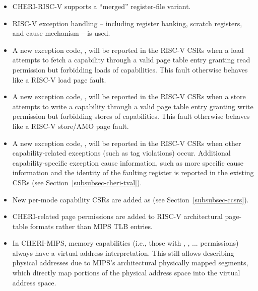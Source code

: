\begin{itemize}
\item CHERI-RISC-V supports a ``merged'' register-file variant.
\item RISC-V exception handling -- including register banking, scratch
  registers, and cause mechanism -- is used.
\item A new exception code, \riscvloadcappagefault{}, will be
  reported in the RISC-V \xcause{} CSRs when a load attempts to fetch a
  capability through a valid page table entry granting read permission but
  forbidding loads of capabilities.  This fault otherwise behaves like a RISC-V
  load page fault.
\item A new exception code, \riscvstorecappagefault{}, will be
  reported in the RISC-V \xcause{} CSRs when a store attempts to write a
  capability through a valid page table entry granting write permission but
  forbidding stores of capabilities.  This fault otherwise behaves like a
  RISC-V store/AMO page fault.
\item A new exception code, \riscvcheriexception{}, will be
  reported in the RISC-V \xcause{} CSRs when other
  capability-related exceptions (such as tag violations) occur.
  Additional capability-specific exception cause information, such
  as more specific cause information and the identity of the faulting
  register is reported in the existing \xtval{} CSRs (see
  Section~\ref{subsubsec-cheri-tval}).
\item New per-mode capability CSRs are added as \xccsr{} (see
  Section~\ref{subsubsec-ccsrs}).
\item CHERI-related page permissions are added to RISC-V architectural
  page-table formats rather than MIPS TLB entries.
\item In CHERI-MIPS, memory capabilities (i.e., those with \cappermL,
  \cappermS, ... permissions) always have a virtual-address interpretation.
  This still allows describing physical addresses due to MIPS's architectural
  physically mapped segments, which directly map portions of the physical
  address space into the virtual address space.


\end{itemize}
